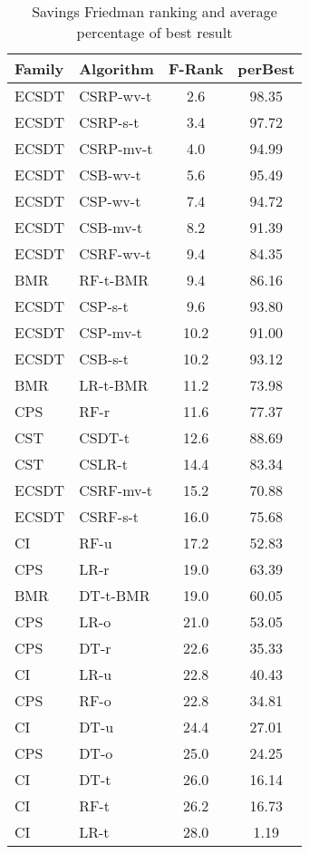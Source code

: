 {    \begin{table}[!t]
     \centering
    \footnotesize
    \begin{tabular}{ll c c  } %
      \hline
      \bf{Family} & \bf{Algorithm} & \bf{F-Rank} & \bf{perBest}\\
      \hline
        ECSDT&CSRP-wv-t&2.6&98.35\\ 
        ECSDT&CSRP-s-t&3.4&97.72\\ 
        ECSDT&CSRP-mv-t&4.0&94.99\\ 
        ECSDT&CSB-wv-t&5.6&95.49\\ 
        ECSDT&CSP-wv-t&7.4&94.72\\ 
        ECSDT&CSB-mv-t&8.2&91.39\\ 
        ECSDT&CSRF-wv-t&9.4&84.35\\ 
        BMR&RF-t-BMR&9.4&86.16\\ 
        ECSDT&CSP-s-t&9.6&93.80\\ 
        ECSDT&CSP-mv-t&10.2&91.00\\ 
        ECSDT&CSB-s-t&10.2&93.12\\ 
        BMR&LR-t-BMR&11.2&73.98\\ 
        CPS&RF-r&11.6&77.37\\ 
        CST&CSDT-t&12.6&88.69\\ 
        CST&CSLR-t&14.4&83.34\\ 
        ECSDT&CSRF-mv-t&15.2&70.88\\ 
        ECSDT&CSRF-s-t&16.0&75.68\\ 
        CI&RF-u&17.2&52.83\\ 
        CPS&LR-r&19.0&63.39\\ 
        BMR&DT-t-BMR&19.0&60.05\\ 
        CPS&LR-o&21.0&53.05\\ 
        CPS&DT-r&22.6&35.33\\ 
        CI&LR-u&22.8&40.43\\ 
        CPS&RF-o&22.8&34.81\\ 
        CI&DT-u&24.4&27.01\\ 
        CPS&DT-o&25.0&24.25\\ 
        CI&DT-t&26.0&16.14\\ 
        CI&RF-t&26.2&16.73\\ 
        CI&LR-t&28.0&1.19\\ 
      \hline
    \end{tabular}
    \caption{Savings Friedman ranking and average percentage of best result}
    \label{tab:9:results_ranking}

\end{table}}
